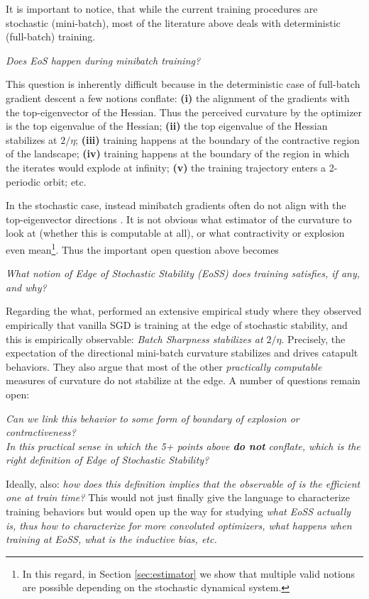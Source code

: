 \documentclass{article} %
\theoremstyle{plain}
\theoremstyle{definition}
\begin{document}
It is important to notice, that while the current training procedures are stochastic (mini-batch), most of the literature above deals with deterministic (full-batch) training. 
\begin{center}
    \textit{Does EoS happen during minibatch training?}
\end{center}
This question is inherently difficult because in the deterministic case of full-batch gradient descent a few notions conflate:
\textbf{(i)} the alignment of the gradients with the top-eigenvector of the Hessian. Thus the perceived curvature by the optimizer is the top eigenvalue of the Hessian;
\textbf{(ii)} the top eigenvalue of the Hessian stabilizes at $2/\eta$;
\textbf{(iii)} training happens at the boundary of the contractive region of the landscape;
\textbf{(iv)} training happens at the boundary of the region in which the iterates would explode at infinity;
\textbf{(v)} the training trajectory enters a 2-periodic orbit; etc.

In the stochastic case, instead minibatch gradients often do not align with the top-eigenvector directions \citep{andreyev}. It is not obvious what estimator of the curvature to look at (whether this is computable at all), or what contractivity or explosion even mean\footnote{In this regard, in Section \ref{sec:estimator} we show that multiple valid notions are possible depending on the stochastic dynamical system.}. Thus the important open question above becomes
\begin{center}
    \textit{What notion of Edge of Stochastic Stability (EoSS) does training satisfies, if any, and why?}
\end{center}
Regarding the what, \citet{andreyev} performed an extensive empirical study where they observed empirically that vanilla SGD is training at the edge of stochastic stability, and this is empirically observable: \textit{Batch Sharpness stabilizes at $2/\eta$}. Precisely, the expectation of the directional mini-batch curvature stabilizes and drives catapult behaviors. They also argue that most of the other \textit{practically computable} measures of curvature do not stabilize at the edge. A number of questions remain open:
\begin{center}
    \textit{Can we link this behavior to some form of boundary of explosion or contractiveness?}\\
    \textit{In this practical sense in which the 5+ points above \textbf{do not} conflate, which is the right definition of Edge of Stochastic Stability?}
\end{center}
Ideally, also: \textit{how does this definition implies that the observable of \citep{andreyev} is the efficient one at train time?}
This would not just finally give the language to characterize training behaviors but would open up the way for studying \textit{what EoSS actually is, thus how to characterize for more convoluted optimizers, what happens when training at EoSS, what is the inductive bias, etc.}
\end{document}
